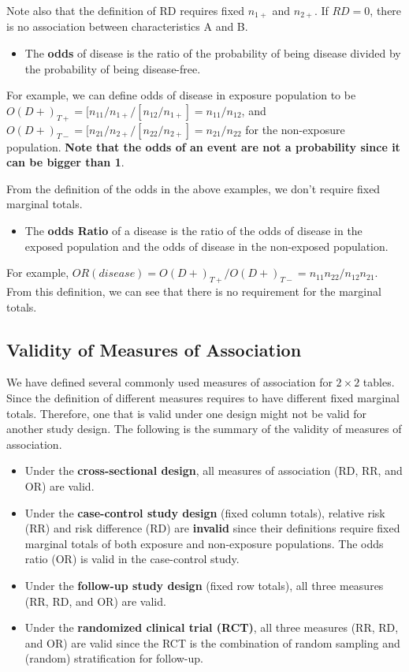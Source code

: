 \documentclass[
]{book}
\providecommand{\tightlist}{%
  \setlength{\itemsep}{0pt}\setlength{\parskip}{0pt}}
\begin{document}
Note also that the definition of RD requires fixed \(n_{1+}\) and \(n_{2+}\). If \(RD = 0\), there is no association between characteristics A and B.

\begin{itemize}
\tightlist
\item
  The \textbf{odds} of disease is the ratio of the probability of being disease divided by the probability of being disease-free.
\end{itemize}

For example, we can define odds of disease in exposure population to be \(O(D+)_{T+} = [n_{11}/n_{1+}/[n_{12}/n_{1+}] = n_{11}/n_{12}\), and \(O(D+)_{T-} = [n_{21}/n_{2+}/[n_{22}/n_{2+}] = n_{21}/n_{22}\) for the non-exposure population. \textbf{Note that the odds of an event are not a probability since it can be bigger than 1}.

From the definition of the odds in the above examples, we don't require fixed marginal totals.

\begin{itemize}
\tightlist
\item
  The \textbf{odds Ratio} of a disease is the ratio of the odds of disease in the exposed population and the odds of disease in the non-exposed population.
\end{itemize}

For example, \(OR(disease) = O(D+)_{T+}/O(D+)_{T-} = n_{11}n_{22}/n_{12}n_{21}\). From this definition, we can see that there is no requirement for the marginal totals.

\hypertarget{validity-of-measures-of-association}{%
\subsection{Validity of Measures of Association}\label{validity-of-measures-of-association}}

We have defined several commonly used measures of association for \(2\times2\) tables. Since the definition of different measures requires to have different fixed marginal totals. Therefore, one that is valid under one design might not be valid for another study design. The following is the summary of the validity of measures of association.

\begin{itemize}
\item
  Under the \textbf{cross-sectional design}, all measures of association (RD, RR, and OR) are valid.
\item
  Under the \textbf{case-control study design} (fixed column totals), relative risk (RR) and risk difference (RD) are \textbf{invalid} since their definitions require fixed marginal totals of both exposure and non-exposure populations. The odds ratio (OR) is valid in the case-control study.
\item
  Under the \textbf{follow-up study design} (fixed row totals), all three measures (RR, RD, and OR) are valid.
\item
  Under the \textbf{randomized clinical trial (RCT)}, all three measures (RR, RD, and OR) are valid since the RCT is the combination of random sampling and (random) stratification for follow-up.
\end{itemize}
\end{document}
